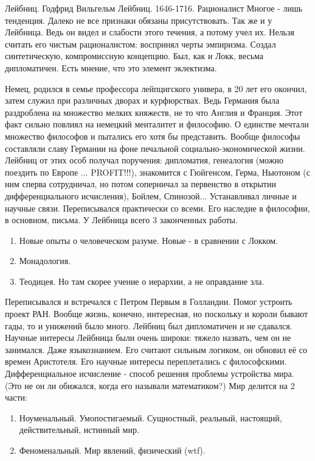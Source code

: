 Лейбниц. Годфрид Вильгельм Лейбниц. 1646-1716. Рационалист
Многое - лишь тенденция. Далеко не все признаки обязаны присутствовать. Так же и у Лейбница. Ведь он видел и слабости этого течения, а потому учел их. Нельзя считать его чистым рационалистом: воспринял черты эмпиризма. Создал синтетическую, компромиссную концепцию. Был, как и Локк, весьма дипломатичен. Есть мнение, что это элемент эклектизма.

Немец, родился в семье профессора лейпцигского универа, в 20 лет его окончил, затем служил при различных дворах и курфюрствах. Ведь Германия была раздроблена на множество мелких княжеств, не то что Англия и Франция. Этот факт сильно повлиял на немецкий менталитет и философию. О единстве мечтали множество философов и пытались его хотя бы представить. Вообще философы составляли славу Германии на фоне печальной социально-экономической жизни. Лейбниц от этих особ получал поручения: дипломатия, генеалогия (можно поездить по Европе ... PROFIT!!!), знакомится с Гюйгенсом, Герма, Ньютоном (с ним сперва сотрудничал, но потом соперничал за первенство в открытии дифференциального исчисления), Бойлем, Спинозой... Устанавливал личные и научные связи. Переписывался практически со всеми. Его наследие в философии, в основном, письма. У Лейбница всего 3 законченных работы.
\begin{enumerate}
	\item Новые опыты о человеческом разуме. Новые - в сравнении с Локком.
	\item Монадология.
	\item Теодицея. Но там скорее учение о иерархии, а не оправдание зла.
\end{enumerate}
	
Переписывался и встречался с Петром Первым в Голландии. Помог устроить проект РАН. Вообще жизнь, конечно, интересная, но поскольку и короли бывают гады, то и унижений было много. Лейбниц был дипломатичен и не сдавался.
Научные интересы Лейбница были очень широки: тяжело назвать, чем он не занимался. Даже языкознанием. Его считают сильным логиком, он обновил её со времен Аристотеля. Его научные интересы переплетались с философскими. Дифференциальное исчисление - способ решения проблемы устройства мира. (Это не он ли обижался, когда его называли математиком?)
Мир делится на 2 части: 
\begin{enumerate}
	\item Ноуменальный. Умопостигаемый. Сущностный, реальный, настоящий, действительный, истинный мир.
	\item Феноменальный. Мир явлений, физический (wtf).
\end{enumerate}

